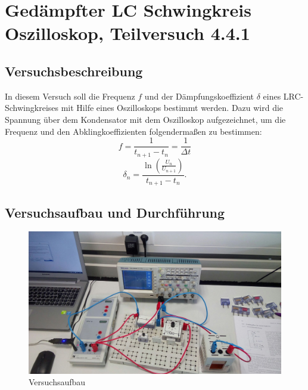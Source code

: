 \documentclass[12pt,a4paper]{article}
\author{Gruppe C14 \\ Julián Häck, Martin Koytek, Lars Wenning, Erik Zimmermann}
\begin{document}
\section{Gedämpfter LC Schwingkreis Oszilloskop, Teilversuch 4.4.1}
\subsection{Versuchsbeschreibung}
In diesem Versuch soll die Frequenz $f$ und der Dämpfungskoeffizient $\delta$ eines LRC-Schwingkreises mit Hilfe eines Oszilloskops bestimmt werden. \newline
Dazu wird die Spannung über dem Kondensator mit dem Oszilloskop aufgezeichnet, um die Frequenz und den Abklingkoeffizienten folgendermaßen zu bestimmen:
\begin{equation}
f=\frac{1}{t_{n+1}-t_n}=\frac{1}{\Delta t}
\end{equation}
\begin{equation}
\delta_n=\frac{\ln{(\frac{U_n}{U_{n+1}})}}{t_{n+1}-t_n}.
\end{equation}


\subsection{Versuchsaufbau und Durchführung}

\begin{figure}[H]
\centering
\includegraphics[scale=0.27]{ArbeitsplatzE_1.jpg}
\caption{Versuchsaufbau}
\end{figure}
\end{document}
